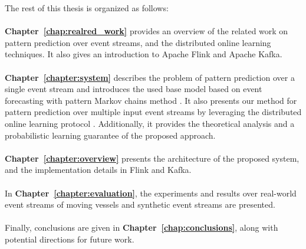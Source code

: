 \par The rest of this thesis is organized as follows:\\
\\
\textbf{Chapter~\ref{chap:realred_work}} provides an overview of the related work on pattern prediction over event streams, and the distributed online learning techniques. It also gives an introduction to Apache Flink and Apache Kafka.
\\
\\
\textbf{Chapter~\ref{chapter:system}} describes the problem of pattern prediction over a single event stream and introduces the used base model based on event forecasting with pattern Markov chains method \cite{alevizos2017event}. It also presents our method for pattern prediction over multiple input event streams by leveraging the distributed online learning protocol \cite{kamp2014communication}. Additionally, it provides the theoretical analysis and a probabilistic learning guarantee of the proposed approach.  
\\
\\
\textbf{Chapter~\ref{chapter:overview}}  presents the architecture of the proposed system, and the implementation details in Flink and Kafka.
\\
\\
In \textbf{Chapter~\ref{chapter:evaluation}}, the experiments and results over real-world event streams of moving vessels and synthetic event streams are presented.
\\
\\
Finally, conclusions are given in \textbf{Chapter~\ref{chap:conclusions}}, along with potential directions for future work.






